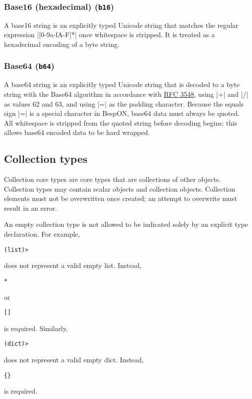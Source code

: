 \documentclass[11pt]{article}
\newcommand{\bespon}{BespON}
\begin{document}
\subsubsection{Base16 (hexadecimal) (\texttt{b16})}

A base16 string is an explicitly typed Unicode string that matches the regular expression |[0-9a-fA-F]*| once whitespace is stripped.  It is treated as a hexadecimal encoding of a byte string.


\subsubsection{Base64 (\texttt{b64})}

A base64 string is an explicitly typed Unicode string that is decoded to a byte string with the Base64 algorithm in accordance with \href{https://tools.ietf.org/html/rfc3548}{RFC 3548}, using |+| and |/| as values 62 and 63, and using |=| as the padding character.  Because the equals sign |=| is a special character in \bespon, base64 data must always be quoted.  All whitespace is stripped from the quoted string before decoding begins; this allows base64 encoded data to be hard wrapped.


\subsection{Collection types}

Collection core types are core types that are collections of other objects.  Collection types may contain scalar objects and collection objects.  Collection elements must not be overwritten once created; an attempt to overwrite must result in an error.

An empty collection type is not allowed to be indicated solely by an explicit type declaration.  For example,
\begin{Verbatim}
(list)>
\end{Verbatim}
does not represent a valid empty list.  Instead,
\begin{Verbatim}
*
\end{Verbatim}
or
\begin{Verbatim}
[]
\end{Verbatim}
is required.  Similarly,
\begin{Verbatim}
(dict)>
\end{Verbatim}
does not represent a valid empty dict.  Instead,
\begin{Verbatim}
{}
\end{Verbatim}
is required.
\end{document}
